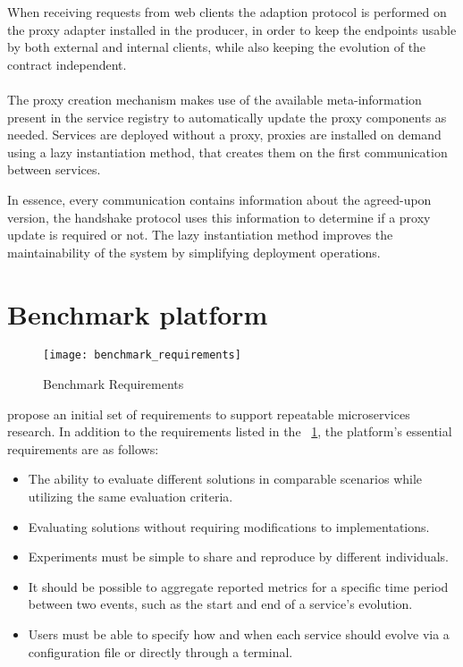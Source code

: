 When receiving requests from web clients the adaption protocol is performed on the proxy adapter installed in the producer,
in order to keep the endpoints usable by both external and internal clients, while also keeping the evolution of the contract independent.

\paragraph{}

The proxy creation mechanism makes use of the available meta-information present in the service registry
to automatically update the proxy components as needed.
Services are deployed without a proxy, proxies are installed on demand using a lazy instantiation method,
that creates them on the first communication between services.

In essence, every communication contains information about the agreed-upon version, the handshake protocol uses this information to determine if a proxy update is required or not.
The lazy instantiation method improves the maintainability of the system by
simplifying deployment operations.

\section{Benchmark platform} %
\label{sec:benchmark_platform}

\begin{figure}[htbp]
    \centering
    \texttt{[image: benchmark\_requirements]}
    \caption{Benchmark Requirements \cite{microservices2017benchmark}}
    \label{fig:benchmark}
\end{figure}

\citeauthor{microservices2017benchmark} propose an initial set of requirements
to support repeatable microservices research.
In addition to the requirements listed in the ~\ref{fig:benchmark}, the platform's essential requirements are as follows:
\begin{itemize}
    \item The ability to evaluate different solutions in comparable scenarios while utilizing the same evaluation criteria.
    \item Evaluating solutions without requiring modifications to implementations.
    \item Experiments must be simple to share and reproduce by different individuals.
    \item It should be possible to aggregate reported metrics for a specific time period between two events, such as the start and end of a service's evolution.
    \item Users must be able to specify how and when each service should evolve via a configuration file or directly through a terminal.
\end{itemize}

